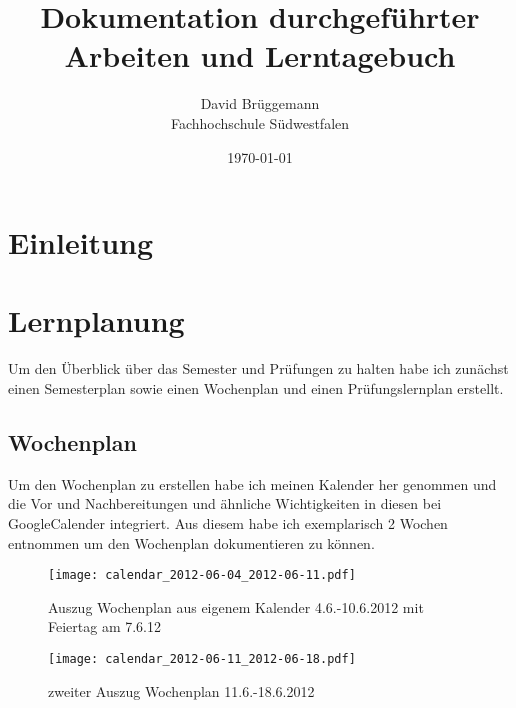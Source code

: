 \documentclass[11pt]{article}
\begin{document}
\begin{titlepage}
  \title{Dokumentation durchgeführter Arbeiten und Lerntagebuch}
  \author{David Brüggemann\\ Fachhochschule Südwestfalen}
  \date{\today}
\end{titlepage}

\maketitle
\fancyfoot[C]{}
\newpage

\tableofcontents
\fancyfoot[C]{}
\newpage

\section{Einleitung}


\section{Lernplanung}
Um den Überblick über das Semester und Prüfungen zu halten habe ich zunächst einen Semesterplan sowie einen Wochenplan und einen Prüfungslernplan erstellt.


\subsection{Wochenplan}
Um den Wochenplan zu erstellen habe ich meinen Kalender her genommen und die Vor und Nachbereitungen und ähnliche Wichtigkeiten in diesen bei GoogleCalender integriert. Aus diesem habe ich exemplarisch 2 Wochen entnommen um den Wochenplan dokumentieren zu können.


\begin{figure}[hbtp]
\centering
    \texttt{[image: calendar\_2012-06-04\_2012-06-11.pdf]}
    \caption{Auszug Wochenplan aus eigenem Kalender 4.6.-10.6.2012 mit Feiertag am 7.6.12}
    \end{figure}
    


\newpage
 
\begin{figure}[hbtp]
\centering
\texttt{[image: calendar\_2012-06-11\_2012-06-18.pdf]}
\caption{zweiter Auszug Wochenplan 11.6.-18.6.2012}
\end{figure}


\newpage
\end{document}
